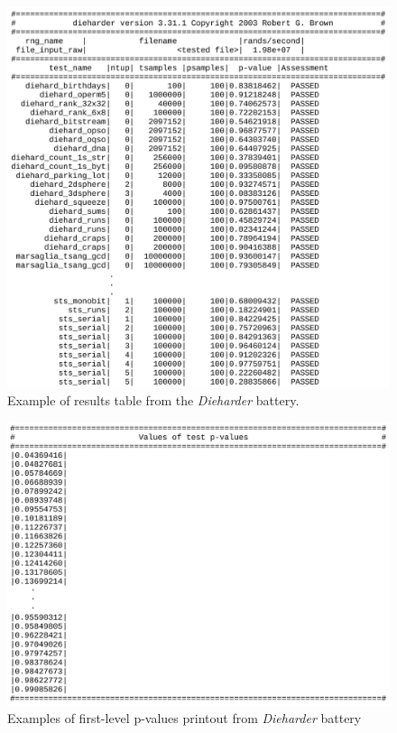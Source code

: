 \documentclass[
  digital,     %
  oneside,     %
  nosansbold,  %
  nocolorbold, %
  nolof,         %
  nolot,         %
]{fithesis4}
\begin{document}
\begin{figure}[H]
  \begin{center}
    \includegraphics[width=12.5cm]{figures/outputs-appendix/dieharder.jpg}
  \end{center}
  \caption{Example of results table from the \emph{Dieharder} battery.}
  \label{fig:die_out}
\end{figure}

\pagebreak

\begin{figure}[H]
  \begin{center}
    \includegraphics[width=12.5cm]{figures/outputs-appendix/pvals.jpg}
  \end{center}
  \caption{Examples of first-level p-values printout from \emph{Dieharder} battery}
  \label{fig:die_pvals}
\end{figure}
\end{document}
